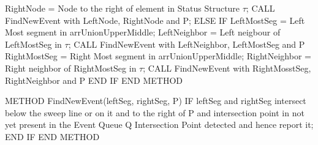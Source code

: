         \newline \hspace*{4em} RightNode = Node to the right of element in Status Structure $\tau$; \newline
        \newline \hspace*{4em} CALL FindNewEvent with LeftNode, RightNode and P;
    \newline \hspace*{2em} ELSE IF
        \newline \hspace*{4em} LeftMostSeg = Left Most segment in arrUnionUpperMiddle;
        \newline \hspace*{4em} LeftNeighbor = Left neigbour of LeftMostSeg in $\tau$; \newline
        \newline \hspace*{4em} CALL FindNewEvent with LeftNeighbor, LeftMostSeg and P \newline
        \newline \hspace*{4em} RightMostSeg = Right Most segment in arrUnionUpperMiddle;
        \newline \hspace*{4em} RightNeighbor = Right neighbor of RightMostSeg in $\tau$; \newline
        \newline \hspace*{4em} CALL FindNewEvent with RightMosstSeg, RightNeighbor and P
    \newline \hspace*{2em} END IF
\newline END METHOD \newline

\noindent
\newline METHOD FindNewEvent(leftSeg, rightSeg, P)
    \newline \hspace*{2em} IF leftSeg and rightSeg intersect below the sweep line or on it and to the right of P and intersection point in not yet present in the Event Queue Q
    \newline \hspace*{4em} Intersection Point detected and hence report it;
    \newline \hspace*{2em} END IF
\newline END METHOD \newline


